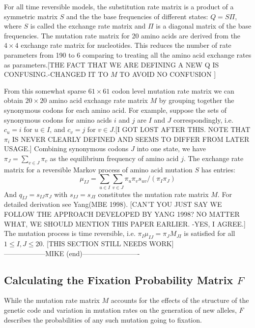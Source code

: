 \documentclass[13pt]{article}
\begin{document}
For all time reversible models, the substitution rate matrix is a product of a symmetric matrix $S$ and the the base frequencies of different states: $Q = S\Pi$, where $S$ is called the exchange rate matrix and $\Pi$ is a diagonal matrix of the base frequencies.
The mutation rate matrix for 20 amino acids are derived from the $4 \times 4 $ exchange rate matrix for nucleotides.
This reduces the number of rate parameters from 190 to 6 comparing to treating all the amino acid exchange rates as parameters.[THE FACT THAT WE ARE DEFINING A NEW Q IS CONFUSING.-CHANGED IT TO $M$ TO AVOID NO CONFUSION ]

From this somewhat sparse $61 \times 61$ codon level mutation rate matrix we can obtain $20 \times 20$ amino acid exchange rate matrix $M$ by grouping together the synonymous codons for each amino acid.
For example, suppose the sets of synonymous codons for amino acids $i$ and $j$ are $I$ and $J$ correspondingly, i.e. $c_u = i$ for $u \in I$, and $c_v = j$ for $v \in J$.[I GOT LOST AFTER THIS. NOTE THAT $\pi_i$ IS NEVER CLEARLY DEFINED AND SEEMS TO DIFFER FROM LATER USAGE.]
Combining synonymous codons $J$ into one state, we have $\pi_J = \sum_{v \in J} \pi_v$ as the equilibrium frequency of amino acid $j$.
The exchange rate matrix for a reversible Markov process of amino acid mutation $S$ has entries:
\[\mu_{IJ} = \sum_{u \in I} \sum_{v \in J} \pi_u \pi_v s_{uv} / (\pi_I \pi_J)\]
\noindent
And $q_{IJ} = s_{IJ} \pi_J$ with $s_{IJ}  = s_{JI}$ constitutes the mutation rate matrix $M$.
For detailed derivation see Yang(MBE 1998). [CAN'T YOU JUST SAY WE FOLLOW THE APPROACH DEVELOPED BY YANG 1998?  NO MATTER WHAT, WE SHOULD MENTION THIS PAPER EARLIER. -YES, I AGREE.]
The mutation process is time reversible, i.e. $\pi_I \mu_{IJ} = \pi_J M_{JI}$ is satisfied for all $1 \leq I,J \leq 20$.
[THIS SECTION STILL NEEDS WORK]\\
------------------MIKE (end)-------------------------
\subsection*{Calculating the Fixation Probability Matrix $F$}
While the mutation rate matrix $M$ accounts for the effects of the structure of the genetic code and variation in mutation rates on the generation of new alleles,  $F$ describes the probabilities of any such mutation going to fixation.

\end{document}
